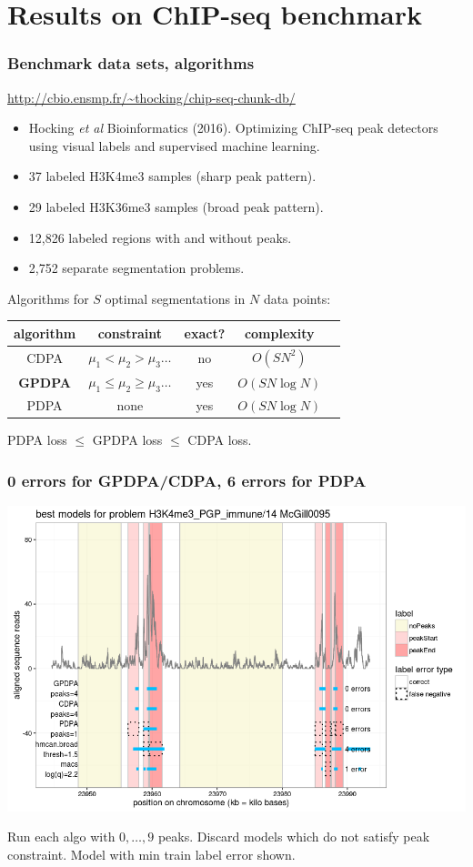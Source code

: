 \documentclass{beamer}
\begin{document}
\section{Results on ChIP-seq benchmark}

\begin{frame}
  \frametitle{Benchmark data sets, algorithms}

 \url{http://cbio.ensmp.fr/~thocking/chip-seq-chunk-db/}
  \begin{itemize}
  \item Hocking \emph{et al} Bioinformatics (2016). Optimizing
    ChIP-seq peak detectors using visual labels and supervised machine
    learning.
  \item 37 labeled H3K4me3 samples (sharp peak pattern).
  \item 29 labeled H3K36me3 samples (broad peak pattern).
  \item 12,826 labeled regions with and without peaks.
  \item 2,752 separate segmentation problems.
  \end{itemize}

  Algorithms for $S$ optimal segmentations in $N$ data points:
  \begin{center}
  \begin{tabular}{ccccc}
    algorithm & constraint & exact? & complexity \\
    \hline
    CDPA & $\mu_1 < \mu_2 > \mu_3 \dots$ & no & $O(S N^2)$\\
    \textbf{GPDPA} &
 $\mu_1 \leq \mu_2 \geq \mu_3 \dots$ & yes & $O(S N\log N)$ \\
    PDPA & none & yes & $O(S N\log N)$
  \end{tabular}

  \vskip 0.5cm

  PDPA loss $\leq$ GPDPA loss $\leq$ CDPA loss.
  \end{center}
\end{frame}

\begin{frame}
  \frametitle{0 errors for GPDPA/CDPA, 6 errors for PDPA}
  \includegraphics[width=\textwidth]{figure-min-train-error-problem2-best.png}


  Run each algo with $0,\dots,9$ peaks. Discard models which do not
  satisfy peak constraint. Model with min train label error shown.
\end{frame}
\end{document}
